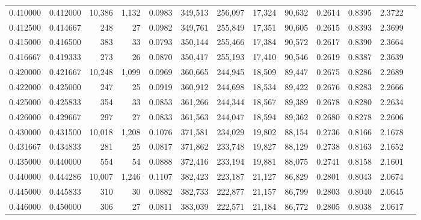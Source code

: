 \begin{tabular}{rrrrrrrrrrrrr}
0.410000 & 0.412000 & 10,386 & 1,132 &                                     0.0983 & 349,513 & 256,097 &  17,324 &  90,632 & 0.2614 & 0.8395 & 2.3722 \\
0.412500 & 0.414667 &    248 &    27 &                                     0.0982 & 349,761 & 255,849 &  17,351 &  90,605 & 0.2615 & 0.8393 & 2.3699 \\
0.415000 & 0.416500 &    383 &    33 &                                     0.0793 & 350,144 & 255,466 &  17,384 &  90,572 & 0.2617 & 0.8390 & 2.3664 \\
0.416667 & 0.419333 &    273 &    26 &                                     0.0870 & 350,417 & 255,193 &  17,410 &  90,546 & 0.2619 & 0.8387 & 2.3639 \\
0.420000 & 0.421667 & 10,248 & 1,099 &                                     0.0969 & 360,665 & 244,945 &  18,509 &  89,447 & 0.2675 & 0.8286 & 2.2689 \\
0.422000 & 0.425000 &    247 &    25 &                                     0.0919 & 360,912 & 244,698 &  18,534 &  89,422 & 0.2676 & 0.8283 & 2.2666 \\
0.425000 & 0.425833 &    354 &    33 &                                     0.0853 & 361,266 & 244,344 &  18,567 &  89,389 & 0.2678 & 0.8280 & 2.2634 \\
0.426000 & 0.429667 &    297 &    27 &                                     0.0833 & 361,563 & 244,047 &  18,594 &  89,362 & 0.2680 & 0.8278 & 2.2606 \\
0.430000 & 0.431500 & 10,018 & 1,208 &                                     0.1076 & 371,581 & 234,029 &  19,802 &  88,154 & 0.2736 & 0.8166 & 2.1678 \\
0.431667 & 0.434833 &    281 &    25 &                                     0.0817 & 371,862 & 233,748 &  19,827 &  88,129 & 0.2738 & 0.8163 & 2.1652 \\
0.435000 & 0.440000 &    554 &    54 &                                     0.0888 & 372,416 & 233,194 &  19,881 &  88,075 & 0.2741 & 0.8158 & 2.1601 \\
0.440000 & 0.444286 & 10,007 & 1,246 &                                     0.1107 & 382,423 & 223,187 &  21,127 &  86,829 & 0.2801 & 0.8043 & 2.0674 \\
0.445000 & 0.445833 &    310 &    30 &                                     0.0882 & 382,733 & 222,877 &  21,157 &  86,799 & 0.2803 & 0.8040 & 2.0645 \\
0.446000 & 0.450000 &    306 &    27 &                                     0.0811 & 383,039 & 222,571 &  21,184 &  86,772 & 0.2805 & 0.8038 & 2.0617 \\

\end{tabular}
